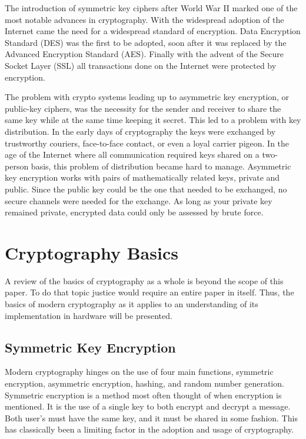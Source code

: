 \documentclass[journal]{IEEEtran}
\begin{document}
The introduction of symmetric key ciphers after World War II marked one of the most notable advances in cryptography.  With the widespread adoption of the Internet came the need for a widespread standard of encryption.  Data Encryption Standard (DES) was the first to be adopted, soon after it was replaced by the Advanced Encryption Standard (AES).  Finally with the advent of the Secure Socket Layer (SSL) all transactions done on the Internet were protected by encryption.


The problem with crypto systems leading up to asymmetric key encryption, or public-key ciphers, was the necessity for the sender and receiver to share the same key while at the same time keeping it secret.  This led to a problem with key distribution.  In the early days of cryptography the keys were exchanged by trustworthy couriers, face-to-face contact, or even a loyal carrier pigeon.  In the age of the Internet where all communication required keys shared on a two-person basis, this problem of distribution became hard to manage.  Asymmetric key encryption works with pairs of mathematically related keys, private and public.  Since the public key could be the one that needed to be exchanged, no secure channels were needed for the exchange.  As long as your private key remained private, encrypted data could only be assessed by brute force.

\section{Cryptography Basics}

A review of the basics of cryptography as a whole is beyond the scope of this paper.  To do that topic justice would require an entire paper in itself.  Thus, the basics of modern cryptography as it applies to an understanding of its implementation in hardware will be presented.

\subsection{Symmetric Key Encryption}

Modern cryptography hinges on the use of four main functions, symmetric encryption, asymmetric encryption, hashing, and random number generation.  Symmetric encryption is a method most often thought of when encryption is mentioned.  It is the use of a single key to both encrypt and decrypt a message.  Both user's must have the same key, and it must be shared in some fashion.  This has classically been a limiting factor in the adoption and usage of cryptography.  
\end{document}
